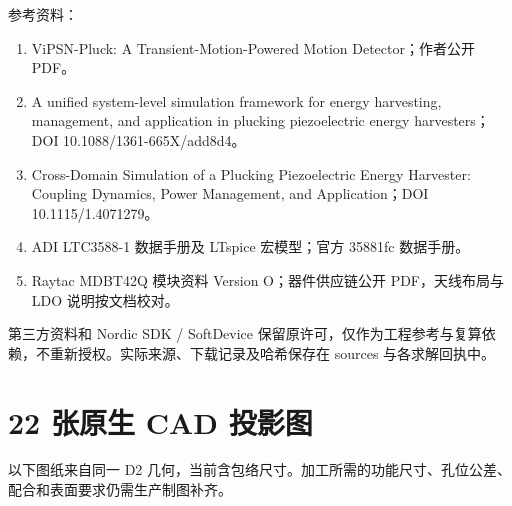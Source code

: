 \documentclass[UTF8,fontset=fandol,11pt]{ctexart}
\begin{document}
参考资料：
\begin{enumerate}
\item ViPSN-Pluck: A Transient-Motion-Powered Motion Detector；作者公开 PDF。
\item A unified system-level simulation framework for energy harvesting, management, and application in plucking piezoelectric energy harvesters；DOI 10.1088/1361-665X/add8d4。
\item Cross-Domain Simulation of a Plucking Piezoelectric Energy Harvester: Coupling Dynamics, Power Management, and Application；DOI 10.1115/1.4071279。
\item ADI LTC3588-1 数据手册及 LTspice 宏模型；官方 35881fc 数据手册。
\item Raytac MDBT42Q 模块资料 Version O；器件供应链公开 PDF，天线布局与 LDO 说明按文档校对。
\end{enumerate}
第三方资料和 Nordic SDK / SoftDevice 保留原许可，仅作为工程参考与复算依赖，不重新授权。实际来源、下载记录及哈希保存在 sources 与各求解回执中。
\appendix\section{22 张原生 CAD 投影图}
以下图纸来自同一 D2 几何，当前含包络尺寸。加工所需的功能尺寸、孔位公差、配合和表面要求仍需生产制图补齐。






















\end{document}
